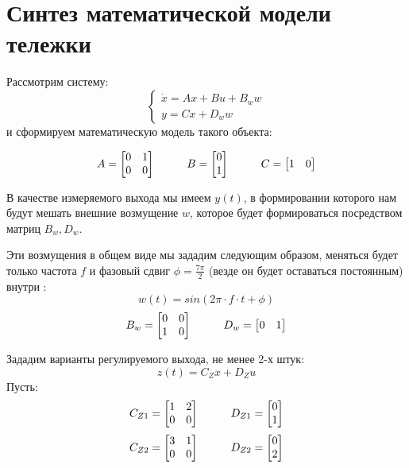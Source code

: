 \chapter{Синтез математической модели тележки}
\label{ch:chap1}

Рассмотрим систему:
$$
  \begin{cases}
    \dot{x} = Ax + Bu + B_w w \\
    y = Cx + D_w w
  \end{cases}
$$ и сформируем математическую модель такого объекта:

$$
  A = \begin{bmatrix}
  0 & 1 \\
  0 & 0 \\
  \end{bmatrix} \hspace*{1cm}
  B = \begin{bmatrix}
    0 \\ 1
  \end{bmatrix} \hspace*{1cm}
  C = \begin{bmatrix}
    1 & 0
  \end{bmatrix}
$$

В качестве измеряемого выхода мы имеем $y(t)$, в формировании которого нам будут мешать внешние возмущение $w$,
которое будет формироваться посредством матриц $B_w, D_w$. 

Эти возмущения в общем виде мы зададим следующим образом, меняться будет только частота $f$ и фазовый сдвиг $\phi = \frac{7\pi}{2}$ (везде он будет оставаться постоянным) внутри :
$$
  w(t) = sin(2\pi \cdot f \cdot t + \phi) 
$$
$$
  B_w = \begin{bmatrix}
  0 & 0 \\ 
  1 & 0 \\ 
  \end{bmatrix} \hspace*{1cm}
  D_w = \begin{bmatrix}
    0 & 1 
  \end{bmatrix}
$$

Зададим варианты регулируемого выхода, не менее 2-х штук:
$$
  z(t) = C_Z x + D_Z u
$$
Пусть:
$$
  C_{Z1} = \begin{bmatrix}
  1 & 2 \\ 
  0 & 0 \\ 
  \end{bmatrix} \hspace*{1cm}
  D_{Z1} = \begin{bmatrix}
    0 \\ 1
  \end{bmatrix}
$$
$$
  C_{Z2} = \begin{bmatrix}
  3 & 1 \\
  0 & 0 
  \end{bmatrix} \hspace*{1cm}
  D_{Z2} = \begin{bmatrix}
    0 \\ 2
  \end{bmatrix}
$$

